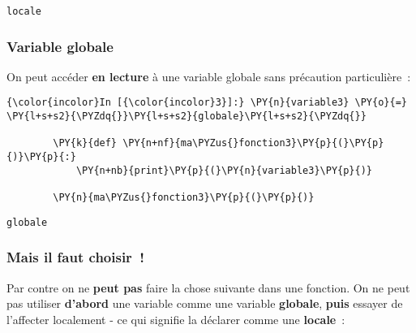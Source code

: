     \begin{Verbatim}[commandchars=\\\{\}]
locale

    \end{Verbatim}

    \hypertarget{variable-globale}{%
\subsubsection{Variable globale}\label{variable-globale}}

    On peut accéder \textbf{en lecture} à une variable globale sans
précaution particulière~:

    \begin{Verbatim}[commandchars=\\\{\}]
{\color{incolor}In [{\color{incolor}3}]:} \PY{n}{variable3} \PY{o}{=} \PY{l+s+s2}{\PYZdq{}}\PY{l+s+s2}{globale}\PY{l+s+s2}{\PYZdq{}}
        
        \PY{k}{def} \PY{n+nf}{ma\PYZus{}fonction3}\PY{p}{(}\PY{p}{)}\PY{p}{:}
            \PY{n+nb}{print}\PY{p}{(}\PY{n}{variable3}\PY{p}{)}
        
        \PY{n}{ma\PYZus{}fonction3}\PY{p}{(}\PY{p}{)}
\end{Verbatim}


    \begin{Verbatim}[commandchars=\\\{\}]
globale

    \end{Verbatim}

    \hypertarget{mais-il-faut-choisir}{%
\subsubsection{Mais il faut choisir~!}\label{mais-il-faut-choisir}}

    Par contre on ne \textbf{peut pas} faire la chose suivante dans une
fonction. On ne peut pas utiliser \textbf{d'abord} une variable comme
une variable \textbf{globale}, \textbf{puis} essayer de l'affecter
localement - ce qui signifie la déclarer comme une \textbf{locale}~:

